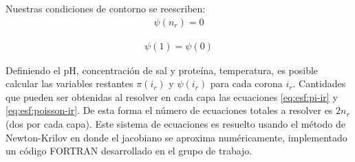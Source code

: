 Nuestras condiciones de contorno se reescriben:
\begin{align}
	\psi(n_r) = 0
\end{align}

\begin{align}
\psi(1) = \psi(0)
\end{align}

Definiendo  el pH, concentraci\'on de sal y prote\'ina, temperatura, es posible calcular las variables restantes  $\pi(i_r)$ y $\psi(i_r)$ para cada corona $i_r$.
Cantidades que pueden ser obtenidas al resolver en cada capa las ecuaciones \ref{eq:esf:pi-ir} y \ref{eq:esf:poisson-ir}.
De esta forma el n\'umero de ecuaciones totales a resolver es $2n_r$ (dos por cada capa). 
Este sistema de ecuaciones es resuelto usando el m\'etodo de Newton-Krilov en donde el jacobiano se aproxima num\'ericamente, implementado un c\'odigo FORTRAN desarrollado en el grupo de trabajo.
